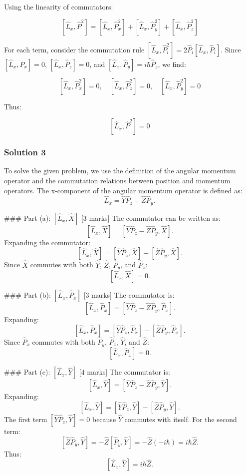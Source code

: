 \documentclass{article}
\begin{document}
Using the linearity of commutators:

\[
\left[\hat{L}_x, \hat{P}^2\right] = \left[\hat{L}_x, \hat{P}_x^2\right] + \left[\hat{L}_x, \hat{P}_y^2\right] + \left[\hat{L}_x, \hat{P}_z^2\right]
\]

For each term, consider the commutation rule \([\hat{L}_x, \hat{P}_i^2] = 2\hat{P}_i [\hat{L}_x, \hat{P}_i]\). Since \([\hat{L}_x, \hat{P}_x] = 0\), \([\hat{L}_x, \hat{P}_z] = 0\), and \([\hat{L}_x, \hat{P}_y] = i\hbar \hat{P}_z\), we find:

\[
\left[\hat{L}_x, \hat{P}_x^2\right] = 0, \quad \left[\hat{L}_x, \hat{P}_z^2\right] = 0, \quad \left[\hat{L}_x, \hat{P}_y^2\right] = 0
\]

Thus:

\[
\left[\hat{L}_x, \hat{P}^2\right] = 0
\]

\subsubsection{Solution 3}
To solve the given problem, we use the definition of the angular momentum operator and the commutation relations between position and momentum operators. The x-component of the angular momentum operator is defined as:
\[
\hat{L}_x = \hat{Y}\hat{P}_z - \hat{Z}\hat{P}_y.
\]

### Part (a): \(\left[\hat{L}_x, \hat{X}\right]\) [3 marks]
The commutator can be written as:
\[
\left[\hat{L}_x, \hat{X}\right] = \left[\hat{Y}\hat{P}_z - \hat{Z}\hat{P}_y, \hat{X}\right].
\]
Expanding the commutator:
\[
\left[\hat{L}_x, \hat{X}\right] = \left[\hat{Y}\hat{P}_z, \hat{X}\right] - \left[\hat{Z}\hat{P}_y, \hat{X}\right].
\]
Since \(\hat{X}\) commutes with both \(\hat{Y}\), \(\hat{Z}\), \(\hat{P}_y\), and \(\hat{P}_z\):
\[
\left[\hat{L}_x, \hat{X}\right] = 0.
\]

### Part (b): \(\left[\hat{L}_x, \hat{P}_x\right]\) [3 marks]
The commutator is:
\[
\left[\hat{L}_x, \hat{P}_x\right] = \left[\hat{Y}\hat{P}_z - \hat{Z}\hat{P}_y, \hat{P}_x\right].
\]
Expanding:
\[
\left[\hat{L}_x, \hat{P}_x\right] = \left[\hat{Y}\hat{P}_z, \hat{P}_x\right] - \left[\hat{Z}\hat{P}_y, \hat{P}_x\right].
\]
Since \(\hat{P}_x\) commutes with both \(\hat{P}_y\), \(\hat{P}_z\), \(\hat{Y}\), and \(\hat{Z}\):
\[
\left[\hat{L}_x, \hat{P}_x\right] = 0.
\]

### Part (c): \(\left[\hat{L}_x, \hat{Y}\right]\) [4 marks]
The commutator is:
\[
\left[\hat{L}_x, \hat{Y}\right] = \left[\hat{Y}\hat{P}_z - \hat{Z}\hat{P}_y, \hat{Y}\right].
\]
Expanding:
\[
\left[\hat{L}_x, \hat{Y}\right] = \left[\hat{Y}\hat{P}_z, \hat{Y}\right] - \left[\hat{Z}\hat{P}_y, \hat{Y}\right].
\]
The first term \(\left[\hat{Y}\hat{P}_z, \hat{Y}\right] = 0\) because \(\hat{Y}\) commutes with itself. For the second term:
\[
\left[\hat{Z}\hat{P}_y, \hat{Y}\right] = -\hat{Z}\left[\hat{P}_y, \hat{Y}\right] = -\hat{Z}(-i\hbar) = i\hbar\hat{Z}.
\]
Thus:
\[
\left[\hat{L}_x, \hat{Y}\right] = i\hbar\hat{Z}.
\]
\end{document}
